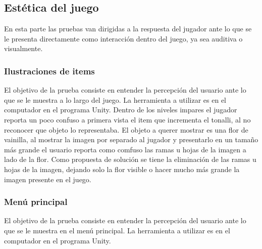\subsection{Estética del juego}
En esta parte las pruebas van dirigidas a la respuesta del jugador ante lo que se le presenta directamente como interacción dentro del juego, ya sea auditiva o visualmente.
\subsubsection{Ilustraciones de items}
El objetivo de la prueba consiste en entender la percepción del usuario ante lo que se le muestra a lo largo del juego. La herramienta a utilizar es en el computador en el programa Unity. Dentro de los niveles impares el jugador reporta un poco confuso a primera vista el item que incrementa el tonalli, al no reconocer que objeto lo representaba. El objeto a querer mostrar es una flor de vainilla, al mostrar la imagen por separado al jugador y presentarlo en un tamaño más grande el usuario reporta como comfuso las ramas u hojas de la imagen a lado de la flor. Como propuesta de solución se tiene la eliminación de las ramas u hojas de la imagen, dejando solo la flor visible o hacer mucho más grande la imagen presente en el juego.
\subsubsection{Menú principal}
El objetivo de la prueba consiste en entender la percepción del usuario ante lo que se le muestra en el menú principal. La herramienta a utilizar es en el computador en el programa Unity.